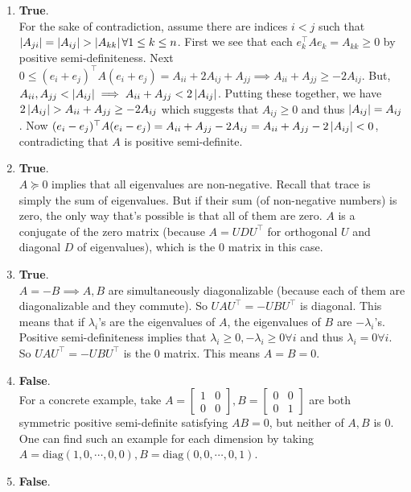 \begin{enumerate}[leftmargin=*, label=(\alph*)]
\item \textbf{True}.\\
For the sake of contradiction, assume there are indices $i< j$ such that $\abs{A_{ji}}=\abs{A_{ij}}>\abs{A_{kk}}\forall 1\leq k\leq n$. First we see that each $e_k^\top Ae_k = A_{kk}\geq 0$ by positive semi-definiteness. Next $0\leq (e_i+e_j)^\top A (e_i+e_j) = A_{ii} + 2A_{ij} + A_{jj}\implies A_{ii}+ A_{jj} \ge-2A_{ij}$. But, $A_{ii}, A_{jj} < \left| A_{ij} \right|\implies A_{ii}+A_{jj} < 2 \left| A_{ij} \right|$. Putting these together, we have $2\left| A_{ij} \right| > A_{ii} + A_{jj} \ge -2A_{ij}$ which suggests that $A_{ij}\ge 0$ and thus $\left| A_{ij} \right|=A_{ij}$. Now $(e_i-e_j)^\top A(e_i-e_j) = A_{ii} + A_{jj} - 2A_{ij} = A_{ii} + A_{jj} - 2\left| A_{ij} \right| < 0$, contradicting that $A$ is positive semi-definite.
\item \textbf{True}.\\
$A\succeq 0$ implies that all eigenvalues are non-negative. Recall that trace is simply the sum of eigenvalues. But if their sum (of non-negative numbers) is zero, the only way that's possible is that all of them are zero. $A$ is a conjugate of the zero matrix (because $A = UDU^\top$ for orthogonal $U$ and diagonal $D$ of eigenvalues), which is the $0$ matrix in this case.
\item \textbf{True}.\\
$A=-B\implies A,B$ are simultaneously diagonalizable (because each of them are diagonalizable and they commute). So $UAU^\top = -UBU^\top$ is diagonal. This means that if $\lambda_i$'s are the eigenvalues of $A$, the eigenvalues of $B$ are $-\lambda_i$'s. Positive semi-definiteness implies that $\lambda_i\geq 0, -\lambda_i\geq 0\forall i$ and thus $\lambda_i = 0\forall i$. So $UAU^\top = -UBU^\top$ is the $0$ matrix. This means $A=B=0$.
\item \textbf{False}.\\
For a concrete example, take $A = \begin{bmatrix}1&0\\0&0\end{bmatrix}, B = \begin{bmatrix}0&0\\0&1\end{bmatrix}$ are both symmetric positive semi-definite satisfying $AB=0$, but neither of $A,B$ is $0$. One can find such an example for each dimension by taking $A=\text{diag}(1,0,\cdots,0,0), B=\text{diag}(0,0,\cdots,0,1)$.
\item \textbf{False}.\\

\end{enumerate}
